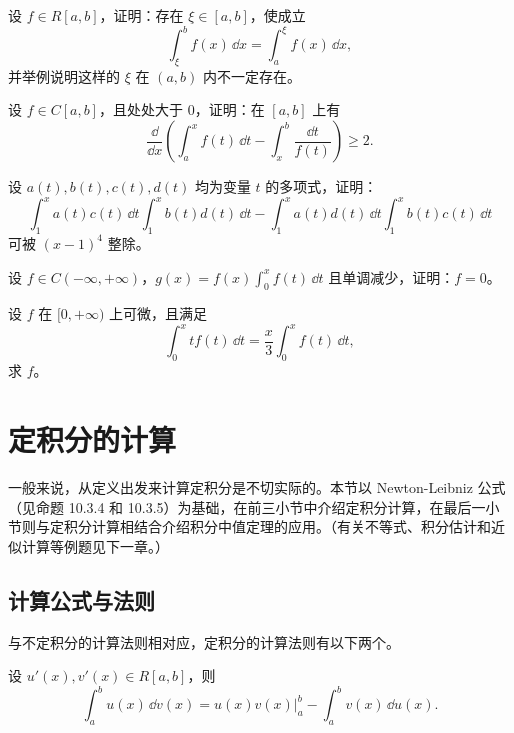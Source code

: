 \begin{xexercise}[8]
设 $f\in R[a,b]$，证明：存在 $\xi\in[a,b]$，使成立
\[
  \int_\xi^b f(x)\,\dd x=\int_a^\xi f(x)\,\dd x,
\]
并举例说明这样的 $\xi$ 在 $(a,b)$ 内不一定存在。
\end{xexercise}

\begin{xexercise}[9]
设 $f\in C[a,b]$，且处处大于 0，证明：在 $[a,b]$ 上有
\[
  \frac{\dd}{\dd x}\left(\int_a^x f(t)\,\dd t-\int_x^b\frac{\dd t}{f(t)}\right)\geqslant2.
\]
\end{xexercise}


\begin{xexercise}[10]
设 $a(t),b(t),c(t),d(t)$ 均为变量 $t$ 的多项式，证明：
\[
  \int_1^x a(t)c(t)\,\dd t\int_1^x b(t)d(t)\,\dd t
  -\int_1^x a(t)d(t)\,\dd t\int_1^x b(t)c(t)\,\dd t
\]
可被 $(x-1)^4$ 整除。
\end{xexercise}

\begin{xexercise}[11]
设 $f\in C(-\infty,+\infty)$，$g(x)=f(x)\int_0^x f(t)\,\dd t$ 且单调减少，证明：$f=0$。
\end{xexercise}

\begin{xexercise}[12]
设 $f$ 在 $[0,+\infty)$ 上可微，且满足
\[
  \int_0^x t f(t)\,\dd t=\frac{x}{3}\int_0^x f(t)\,\dd t,
\]
求 $f$。
\end{xexercise}

\section{定积分的计算}

一般来说，从定义出发来计算定积分是不切实际的。本节以 Newton-Leibniz 公式（见命题 10.3.4 和 10.3.5）为基础，在前三小节中介绍定积分计算，在最后一小节则与定积分计算相结合介绍积分中值定理的应用。（有关不等式、积分估计和近似计算等例题见下一章。）

\subsection{计算公式与法则}

与不定积分的计算法则相对应，定积分的计算法则有以下两个。

\begin{xtheorem}[10.4.1（定积分的分部积分法）]
设 $u'(x),v'(x)\in R[a,b]$，则
\begin{equation}
  \int_a^b u(x)\,\dd v(x)
  =u(x)v(x)\Big|_a^b-\int_a^b v(x)\,\dd u(x).
  \tag{10.11}
  \label{eq:10.11}
\end{equation}
\end{xtheorem}

